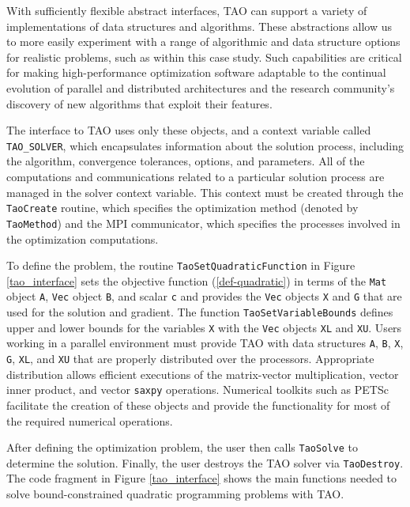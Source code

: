 \documentclass{esub2acm}
\begin{document}
With sufficiently flexible 
abstract interfaces, TAO can support a variety of implementations of 
data structures and algorithms.  These abstractions allow us
to more easily experiment with a range of algorithmic and data
structure options for realistic problems, such as within this case
study.  Such capabilities are critical for making high-performance
optimization software adaptable to the continual evolution of parallel
and distributed architectures and the research community's discovery
of new algorithms that exploit their features.

The interface to TAO uses only these objects, and a
context variable called \texttt{TAO\_SOLVER}, which encapsulates
information about the solution process, including the algorithm,
convergence tolerances, options, and parameters.  All of the
computations and communications related to a particular solution
process are managed in the solver context variable.  This context
must be created through the  \texttt{TaoCreate} routine, which
specifies the optimization method (denoted by
\texttt{TaoMethod}) and the MPI communicator, which specifies the
processes involved in the optimization computations.

To define the problem, the routine 
\texttt{TaoSetQuadraticFunction} in Figure \ref{tao_interface}
sets the objective
function (\ref{def-quadratic}) in terms of the \texttt{Mat} object \texttt{A},
\texttt{Vec} object \texttt{B}, and scalar \texttt{c}
and provides the \texttt{Vec} objects \texttt{X} and \texttt{G} 
that are used for the solution and gradient.
The function
\texttt{TaoSetVariableBounds} defines upper and lower bounds for the variables
\texttt{X} with the \texttt{Vec} objects \texttt{XL} and \texttt{XU}.
Users working in a parallel environment must provide TAO with data structures
\texttt{A}, \texttt{B}, \texttt{X}, \texttt{G}, \texttt{XL}, and \texttt{XU} 
that are properly distributed over the processors.  
Appropriate distribution allows efficient executions of the 
matrix-vector multiplication, vector inner product, and vector \texttt{saxpy}
operations.
Numerical toolkits such as PETSc facilitate the creation of these objects and
provide the functionality for most of the required numerical operations.

After defining
the optimization problem, the user then calls \texttt{TaoSolve} to
determine the solution.  Finally, the user destroys the TAO solver via
\texttt{TaoDestroy}.  The code fragment in Figure \ref{tao_interface}
shows the main functions needed to solve bound-constrained quadratic
programming problems with TAO.
\end{document}
